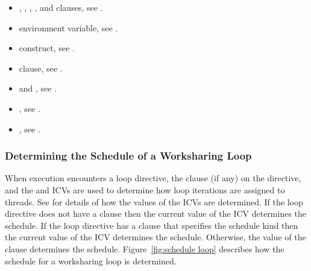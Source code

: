 \crossreferences
\begin{itemize}
\item {}, , , , and  clauses, see
.

\item {} environment variable, see
.

\item {} construct, see
.

\item {} clause, see
.

\item {} and , see
  .
\item {}, see .

\item {}, see
.

\end{itemize}








\subsubsection{Determining the Schedule of a Worksharing Loop}
\label{subsubsec:Determining the Schedule of a Worksharing Loop}
When execution encounters a loop directive, the  clause (if any) on the
directive, and the  and  ICVs are used to determine how loop
iterations are assigned to threads. See
for details of how the
values of the ICVs are determined. If the loop directive does not have a 
clause then the current value of the \mbox{} ICV determines the schedule. If the
loop directive has a  clause that specifies the  schedule kind then
the current value of the  ICV determines the schedule. Otherwise, the
value of the  clause determines the schedule. Figure~\ref{fig:schedule loop}
describes how the schedule for a worksharing loop is determined.

